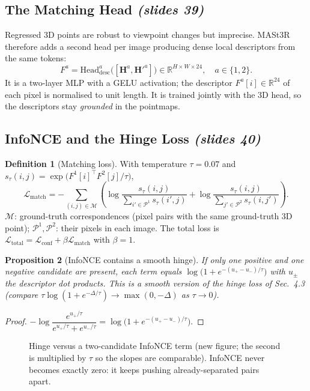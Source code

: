 \documentclass[11pt,a4paper]{article}
\newcommand{\slr}[1]{\texorpdfstring{\emph{(slides #1)}}{(slides #1)}}
\theoremstyle{definition}
\newtheorem{definition}{Definition}[section]
\theoremstyle{plain}
\newtheorem{proposition}[definition]{Proposition}
\theoremstyle{remark}
\begin{document}
\subsection{The Matching Head \slr{39}}
Regressed 3D points are robust to viewpoint changes but imprecise. MASt3R therefore adds a second head per image producing dense local descriptors from the same tokens:
\[ F^a=\mathrm{Head}^a_{\mathrm{desc}}\bigl([\bm H^a,\bm H'^a]\bigr)\in\mathbb R^{H\times W\times24},\quad a\in\{1,2\}. \]
It is a two-layer MLP with a GELU activation; the descriptor $F^a[i]\in\mathbb R^{24}$ of each pixel is normalised to unit length. It is trained jointly with the 3D head, so the descriptors stay \emph{grounded} in the pointmaps.

\subsection{InfoNCE and the Hinge Loss \slr{40}}
\begin{definition}[Matching loss]
With temperature $\tau=0.07$ and $s_\tau(i,j)=\exp\bigl(F^1[i]^{\top}F^2[j]/\tau\bigr)$,
\[
\mathcal L_{\mathrm{match}}=-\sum_{(i,j)\in\mathcal M}\left(\log\frac{s_\tau(i,j)}{\sum_{i'\in\mathcal P^1}s_\tau(i',j)}+\log\frac{s_\tau(i,j)}{\sum_{j'\in\mathcal P^2}s_\tau(i,j')}\right).
\]
$\mathcal M$: ground-truth correspondences (pixel pairs with the same ground-truth 3D point); $\mathcal P^1,\mathcal P^2$: their pixels in each image. The total loss is $\mathcal L_{\mathrm{total}}=\mathcal L_{\mathrm{conf}}+\beta\mathcal L_{\mathrm{match}}$ with $\beta=1$.
\end{definition}
\begin{proposition}[InfoNCE contains a smooth hinge]
If only one positive and one negative candidate are present, each term equals $\log\bigl(1+e^{-(u_+-u_-)/\tau}\bigr)$ with $u_\pm$ the descriptor dot products. This is a smooth version of the hinge loss of Sec.~4.3 (compare $\tau\log(1+e^{-\Delta/\tau})\to\max(0,-\Delta)$ as $\tau\to0$).
\end{proposition}
\begin{proof}
$-\log\dfrac{e^{u_+/\tau}}{e^{u_+/\tau}+e^{u_-/\tau}}=\log\bigl(1+e^{-(u_+-u_-)/\tau}\bigr)$.
\end{proof}
\begin{figure}[H]\centering
{}
\caption{Hinge versus a two-candidate InfoNCE term (new figure; the second is multiplied by $\tau$ so the slopes are comparable). InfoNCE never becomes exactly zero: it keeps pushing already-separated pairs apart.}
\end{figure}
\end{document}
